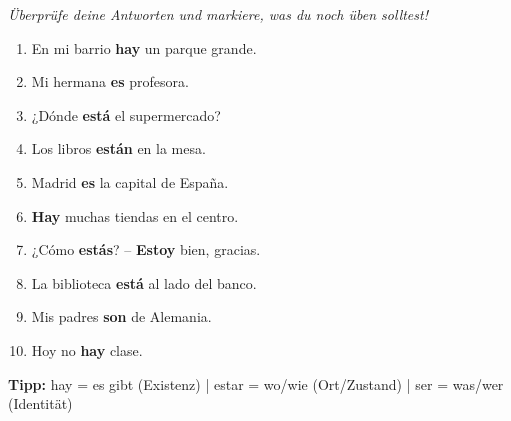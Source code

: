 \documentclass[11pt, a4paper]{article}
\newcommand{\lsg}[1]{\textcolor{loesung}{\textbf{#1}}}
\begin{document}

\begin{center}
\end{center}

\vspace{0.2cm}

\begin{center}
\textit{Überprüfe deine Antworten und markiere, was du noch üben solltest!}
\end{center}

\vspace{0.3cm}


\begin{tcolorbox}[
    colback=hellgrau,
    colframe=spanisch,
    title={\color{white}\bfseries Aufgabe 1: Completa con ser, estar o hay},
    fonttitle=\bfseries
]

\begin{enumerate}[label=\alph*)]
    \item En mi barrio \lsg{hay} un parque grande.
    \item Mi hermana \lsg{es} profesora.
    \item ¿Dónde \lsg{está} el supermercado?
    \item Los libros \lsg{están} en la mesa.
    \item Madrid \lsg{es} la capital de España.
    \item \lsg{Hay} muchas tiendas en el centro.
    \item ¿Cómo \lsg{estás}? -- \lsg{Estoy} bien, gracias.
    \item La biblioteca \lsg{está} al lado del banco.
    \item Mis padres \lsg{son} de Alemania.
    \item Hoy no \lsg{hay} clase.
\end{enumerate}

\vspace{0.2cm}
\footnotesize\textbf{Tipp:} hay = es gibt (Existenz) | estar = wo/wie (Ort/Zustand) | ser = was/wer (Identität)
\end{tcolorbox}
\end{document}
